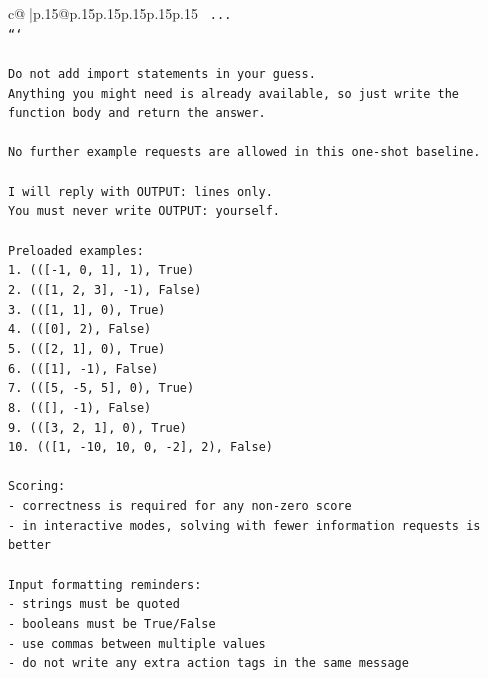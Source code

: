 \documentclass{article}
\begin{document}
{\begin{supertabular}{c@{$\;$}|p{.15\linewidth}@{}p{.15\linewidth}p{.15\linewidth}p{.15\linewidth}p{.15\linewidth}p{.15\linewidth}}
{{{\texttt{    ...} \\
\texttt{```} \\
\\ 
\texttt{Do not add import statements in your guess.} \\
\texttt{Anything you might need is already available, so just write the function body and return the answer.} \\
\\ 
\texttt{No further example requests are allowed in this one{-}shot baseline.} \\
\\ 
\texttt{I will reply with OUTPUT: lines only.} \\
\texttt{You must never write OUTPUT: yourself.} \\
\\ 
\texttt{Preloaded examples:} \\
\texttt{1. (({[}{-}1, 0, 1{]}, 1), True)} \\
\texttt{2. (({[}1, 2, 3{]}, {-}1), False)} \\
\texttt{3. (({[}1, 1{]}, 0), True)} \\
\texttt{4. (({[}0{]}, 2), False)} \\
\texttt{5. (({[}2, 1{]}, 0), True)} \\
\texttt{6. (({[}1{]}, {-}1), False)} \\
\texttt{7. (({[}5, {-}5, 5{]}, 0), True)} \\
\texttt{8. (({[}{]}, {-}1), False)} \\
\texttt{9. (({[}3, 2, 1{]}, 0), True)} \\
\texttt{10. (({[}1, {-}10, 10, 0, {-}2{]}, 2), False)} \\
\\ 
\texttt{Scoring:} \\
\texttt{{-} correctness is required for any non{-}zero score} \\
\texttt{{-} in interactive modes, solving with fewer information requests is better} \\
\\ 
\texttt{Input formatting reminders:} \\
\texttt{{-} strings must be quoted} \\
\texttt{{-} booleans must be True/False} \\
\texttt{{-} use commas between multiple values} \\
\texttt{{-} do not write any extra action tags in the same message} \\
\\ 
}}}
\end{supertabular}}
\end{document}
